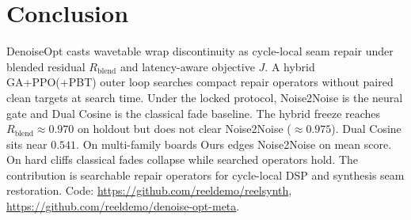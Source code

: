 \section{Conclusion}
\label{sec:conclusion}

DenoiseOpt casts wavetable wrap discontinuity as cycle-local seam repair under blended residual $R_{\mathrm{blend}}$ and latency-aware objective $J$.
A hybrid GA+PPO(+PBT) outer loop searches compact repair operators without paired clean targets at search time.
Under the locked protocol, Noise2Noise is the neural gate and Dual Cosine is the classical fade baseline.
The hybrid freeze reaches $R_{\mathrm{blend}}{\approx}0.970$ on holdout but does not clear Noise2Noise (${\approx}0.975$).
Dual Cosine sits near $0.541$.
On multi-family boards Ours edges Noise2Noise on mean score.
On hard cliffs classical fades collapse while searched operators hold.
The contribution is searchable repair operators for cycle-local DSP and synthesis seam restoration.
Code: \url{https://github.com/reeldemo/reelsynth}, \url{https://github.com/reeldemo/denoise-opt-meta}.
